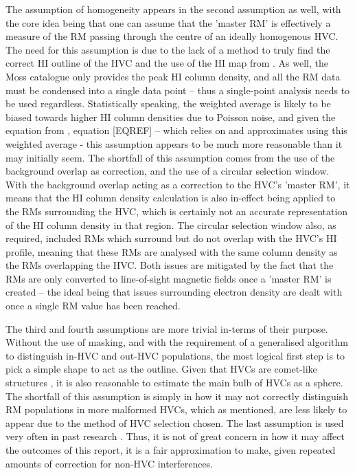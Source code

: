 The assumption of homogeneity appears in the second assumption as well, with the core idea being that one can assume that the 'master RM' is effectively a measure of the RM passing through the centre of an ideally homogenous HVC. The need for this assumption is due to the lack of a method to truly find the correct HI outline of the HVC and the use of the HI map from \cite{ID6}. As well, the Moss catalogue only provides the peak HI column density, and all the RM data must be condensed into a single data point – thus a single-point analysis needs to be used regardless.  Statistically speaking, the weighted average is likely to be biased towards higher HI column densities due to Poisson noise, and given the equation from \cite{ID27}, equation [EQREF] – which relies on and approximates using this weighted average - this assumption appears to be much more reasonable than it may initially seem. The shortfall of this assumption comes from the use of the background overlap as correction, and the use of a circular selection window. With the background overlap acting as a correction to the HVC's 'master RM', it means that the HI column density calculation is also in-effect being applied to the RMs surrounding the HVC, which is certainly not an accurate representation of the HI column density in that region. The circular selection window also, as required, included RMs which surround but do not overlap with the HVC's HI profile, meaning that these RMs are analysed with the same column density as the RMs overlapping the HVC. Both issues are mitigated by the fact that the RMs are only converted to line-of-sight magnetic fields once a 'master RM' is created – the ideal being that issues surrounding electron density are dealt with once a single RM value has been reached.


The third and fourth assumptions are more trivial in-terms of their purpose. Without the use of masking, and with the requirement of a generalised algorithm to distinguish in-HVC and out-HVC populations, the most logical first step is to pick a simple shape to act as the outline. Given that HVCs are comet-like structures \citep{ID13}, it is also reasonable to estimate the main bulb of HVCs as a sphere. The shortfall of this assumption is simply in how it may not correctly distinguish RM populations in more malformed HVCs, which as mentioned, are less likely to appear due to the method of HVC selection chosen. The last assumption is used very often in past research \citep{ID27,ID3, ID26, ID5}. Thus, it is not of great concern in how it may affect the outcomes of this report, it is a fair approximation to make, given repeated amounts of correction for non-HVC interferences.


